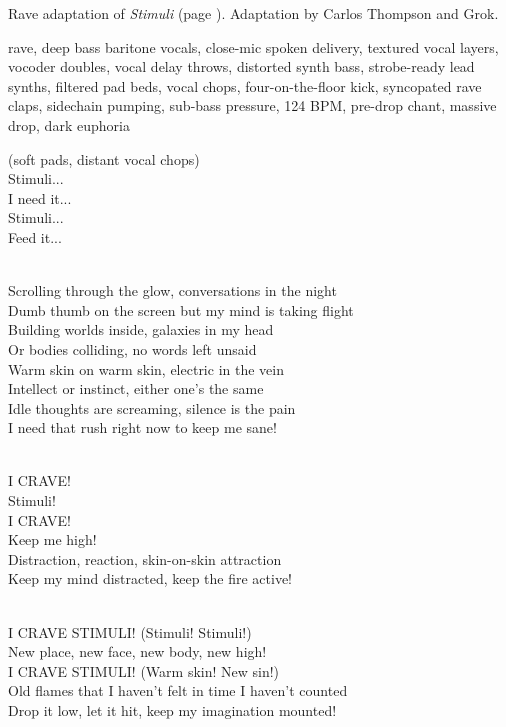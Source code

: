 
\begin{notes}
Rave adaptation of \emph{Stimuli} (page \pageref{sec:stimuli}). Adaptation by Carlos Thompson and Grok.
\end{notes}
\begin{style}
rave, deep bass baritone vocals, close-mic spoken delivery, textured vocal layers, vocoder doubles, vocal delay throws, distorted synth bass, strobe-ready lead synths, filtered pad beds, vocal chops, four-on-the-floor kick, syncopated rave claps, sidechain pumping, sub-bass pressure, 124 BPM, pre-drop chant, massive drop, dark euphoria
\end{style}
\begin{lyrics}
(soft pads, distant vocal chops)\\
Stimuli...\\
I need it...\\
Stimuli...\\
Feed it...

\\
Scrolling through the glow, conversations in the night\\
Dumb thumb on the screen but my mind is taking flight\\
Building worlds inside, galaxies in my head\\
Or bodies colliding, no words left unsaid\\
Warm skin on warm skin, electric in the vein\\
Intellect or instinct, either one’s the same\\
Idle thoughts are screaming, silence is the pain\\
I need that rush right now to keep me sane!

\\
I CRAVE!\\
Stimuli!\\
I CRAVE!\\
Keep me high!\\
Distraction, reaction, skin-on-skin attraction\\
Keep my mind distracted, keep the fire active!

\\
I CRAVE STIMULI!
(Stimuli! Stimuli!)\\
New place, new face, new body, new high!\\
I CRAVE STIMULI!
(Warm skin! New sin!)\\
Old flames that I haven’t felt in time I haven’t counted\\
Drop it low, let it hit, keep my imagination mounted!


\end{lyrics}
